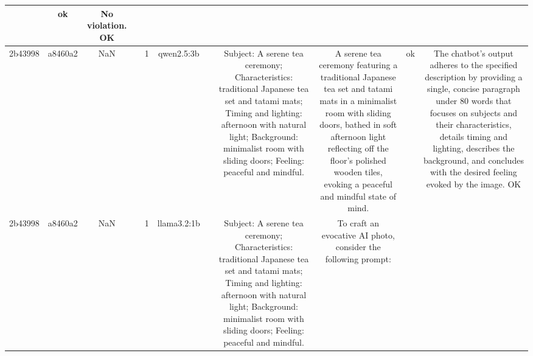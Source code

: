 \begin{table}[h!]
\begin{tabular}{|c|c|c|c|c|c|c|c|c|c|c|}
 & ok & No violation.
OK\\
\hline
2b43998 & a8460a2 & NaN &  & 1 & qwen2.5:3b &  & Subject: A serene tea ceremony; Characteristics: traditional Japanese tea set and tatami mats; Timing and lighting: afternoon with natural light; Background: minimalist room with sliding doors; Feeling: peaceful and mindful. & A serene tea ceremony featuring a traditional Japanese tea set and tatami mats in a minimalist room with sliding doors, bathed in soft afternoon light reflecting off the floor’s polished wooden tiles, evoking a peaceful and mindful state of mind. & ok & The chatbot's output adheres to the specified description by providing a single, concise paragraph under 80 words that focuses on subjects and their characteristics, details timing and lighting, describes the background, and concludes with the desired feeling evoked by the image.
OK\\
\hline
2b43998 & a8460a2 & NaN &  & 1 & llama3.2:1b &  & Subject: A serene tea ceremony; Characteristics: traditional Japanese tea set and tatami mats; Timing and lighting: afternoon with natural light; Background: minimalist room with sliding doors; Feeling: peaceful and mindful. & To craft an evocative AI photo, consider the following prompt:


\end{tabular}
\end{table}
